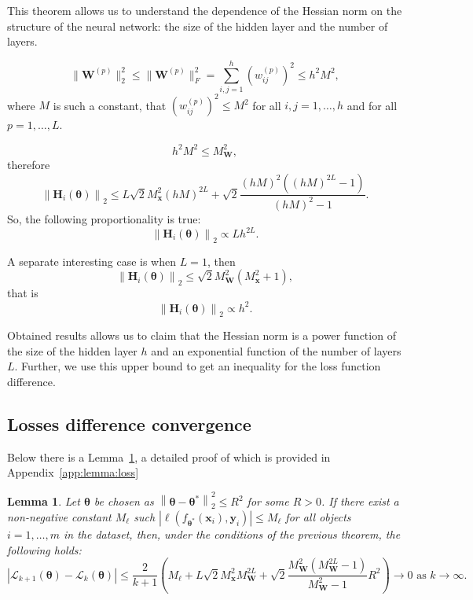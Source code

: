 \documentclass{article}
\newtheorem{lemma}{Lemma}%
\begin{document}
This theorem allows us to understand the dependence of the Hessian norm on the structure of the neural network: the size of the hidden layer and the number of layers. 

\[ \| \mathbf{W}^{(p)} \|_2^2 \leqslant \| \mathbf{W}^{(p)} \|_F^2 = \sum_{i, j = 1}^{h} \left(w_{ij}^{(p)}\right)^2 \leqslant h^2 M^2, \]
where $M$ is such a constant, that $\left(w_{ij}^{(p)}\right)^2 \leqslant  M^2$ for all $i, j = 1, \ldots, h$ and for all $p = 1, \ldots, L$.

\[ h^2 M^2 \leqslant M_{\mathbf{W}}^2, \]
therefore
\[ \left\| \mathbf{H}_i(\boldsymbol{\theta}) \right\|_2 \leqslant L \sqrt{2} M_{\mathbf{x}}^2 (hM)^{2L} + \sqrt{2} \dfrac{(hM)^2 ((hM)^{2L} - 1)}{(hM)^2 - 1}. \]
So, the following proportionality is true:
\[ \left\| \mathbf{H}_i(\boldsymbol{\theta}) \right\|_2 \propto L h^{2L}. \]

A separate interesting case is when $L = 1$, then
\[ \left\| \mathbf{H}_i(\boldsymbol{\theta}) \right\|_2 \leqslant \sqrt{2} M_{\mathbf{W}}^{2} \left( M_{\mathbf{x}}^2 + 1 \right), \]
that is
\[ \left\| \mathbf{H}_i(\boldsymbol{\theta}) \right\|_2 \propto h^2. \]

Obtained results allows us to claim that the Hessian norm is a power function of the size of the hidden layer $h$ and an exponential function of the number of layers $L$. Further, we use this upper bound to get an inequality for the loss function difference.

\subsection{Losses difference convergence}

Below there is a Lemma~\ref{lemma:loss}, a detailed proof of which is provided in Appendix~\ref{app:lemma:loss}

\begin{lemma}\label{lemma:loss}
    Let $\boldsymbol{\theta}$ be chosen as $\left\|\boldsymbol{\theta} - \boldsymbol{\theta}^*\right\|_2^2 \leqslant R^2$ for some $R > 0$. If there exist a non-negative constant $M_{\ell}$ such $\left| \ell(f_{\boldsymbol{\theta}^*}(\mathbf{x}_{i}), \mathbf{y}_{i}) \right| \leqslant M_{\ell}$ for all objects $i = 1, \ldots, m$ in the dataset, then, under the conditions of the previous theorem, the following holds:
    \[ \left| \mathcal{L}_{k+1}(\boldsymbol{\theta}) - \mathcal{L}_k(\boldsymbol{\theta}) \right| \leqslant \dfrac{2}{k+1}\left( M_{\ell} + L \sqrt{2} M_{\mathbf{x}}^2 M_{\mathbf{W}}^{2L} + \sqrt{2} \dfrac{M_{\mathbf{W}}^2 (M_{\mathbf{W}}^{2L} - 1)}{M_{\mathbf{W}}^2 - 1} R^2 \right) \to 0 \text{ as } k \to \infty. \]
\end{lemma}
\end{document}
